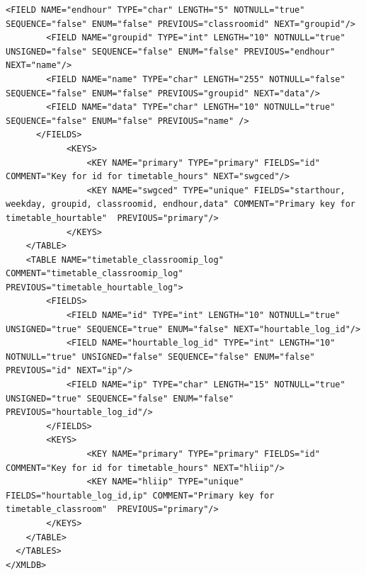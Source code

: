 \documentclass[a4paper]{report}  %
\begin{document}
\begin{lstlisting}[style=XML, caption=Fitxer xmldb install.xml per la creació de les taules]
        <FIELD NAME="endhour" TYPE="char" LENGTH="5" NOTNULL="true" SEQUENCE="false" ENUM="false" PREVIOUS="classroomid" NEXT="groupid"/> 
        <FIELD NAME="groupid" TYPE="int" LENGTH="10" NOTNULL="true" UNSIGNED="false" SEQUENCE="false" ENUM="false" PREVIOUS="endhour" NEXT="name"/> 
        <FIELD NAME="name" TYPE="char" LENGTH="255" NOTNULL="false" SEQUENCE="false" ENUM="false" PREVIOUS="groupid" NEXT="data"/> 
		<FIELD NAME="data" TYPE="char" LENGTH="10" NOTNULL="true" SEQUENCE="false" ENUM="false" PREVIOUS="name" /> 
      </FIELDS> 
		    <KEYS> 
				<KEY NAME="primary" TYPE="primary" FIELDS="id" COMMENT="Key for id for timetable_hours" NEXT="swgced"/>   
				<KEY NAME="swgced" TYPE="unique" FIELDS="starthour, weekday, groupid, classroomid, endhour,data" COMMENT="Primary key for timetable_hourtable"  PREVIOUS="primary"/> 
			</KEYS> 
	</TABLE> 
	<TABLE NAME="timetable_classroomip_log" COMMENT="timetable_classroomip_log" PREVIOUS="timetable_hourtable_log"> 
		<FIELDS> 
			<FIELD NAME="id" TYPE="int" LENGTH="10" NOTNULL="true" UNSIGNED="true" SEQUENCE="true" ENUM="false" NEXT="hourtable_log_id"/> 
			<FIELD NAME="hourtable_log_id" TYPE="int" LENGTH="10" NOTNULL="true" UNSIGNED="false" SEQUENCE="false" ENUM="false" PREVIOUS="id" NEXT="ip"/> 
			<FIELD NAME="ip" TYPE="char" LENGTH="15" NOTNULL="true" UNSIGNED="true" SEQUENCE="false" ENUM="false" PREVIOUS="hourtable_log_id"/> 
		</FIELDS> 
		<KEYS> 
				<KEY NAME="primary" TYPE="primary" FIELDS="id" COMMENT="Key for id for timetable_hours" NEXT="hliip"/>   
				<KEY NAME="hliip" TYPE="unique" FIELDS="hourtable_log_id,ip" COMMENT="Primary key for timetable_classroom"  PREVIOUS="primary"/> 
		</KEYS> 
	</TABLE> 
  </TABLES> 
</XMLDB>
\end{lstlisting}
\end{document}
